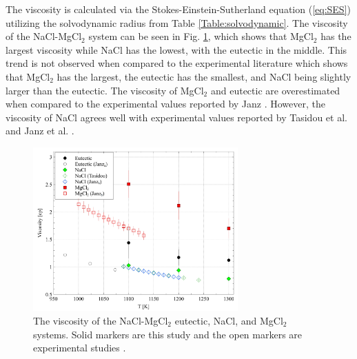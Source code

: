 \documentclass[review]{elsarticle}
\begin{document}
The viscosity is calculated via the Stokes-Einstein-Sutherland equation (\cref{eq:SES}) utilizing the solvodynamic radius from Table \ref{Table:solvodynamic}. The viscosity of the NaCl-MgCl$_2$ system can be seen in Fig. \ref{fig:viscNaCl}, which shows that MgCl$_2$ has the largest viscosity while NaCl has the lowest, with the eutectic in the middle. This trend is not observed when compared to the experimental literature \cite{janz_visc,janz_osti,Tasidou} which shows that MgCl$_2$ has the largest, the eutectic has the smallest, and NaCl being slightly larger than the eutectic. The viscosity of MgCl$_2$ and eutectic are overestimated when compared to the experimental values reported by Janz \cite{janz_visc, janz_osti}. However, the viscosity of NaCl agrees well with experimental values reported by Tasidou et al. \cite{Tasidou} and Janz et al. \cite{janz_osti}. 
\begin{figure}[h!]
 \centering
 \includegraphics[width=0.7\textwidth]{visc_nacl-mgcl2.jpg} 
 \caption{The viscosity of the NaCl-MgCl$_2$ eutectic, NaCl, and MgCl$_2$ systems. Solid markers are this study and the open markers are experimental studies \cite{janz_visc,Tasidou,janz_osti}.}
 \label{fig:viscNaCl}
\end{figure} 
\end{document}
